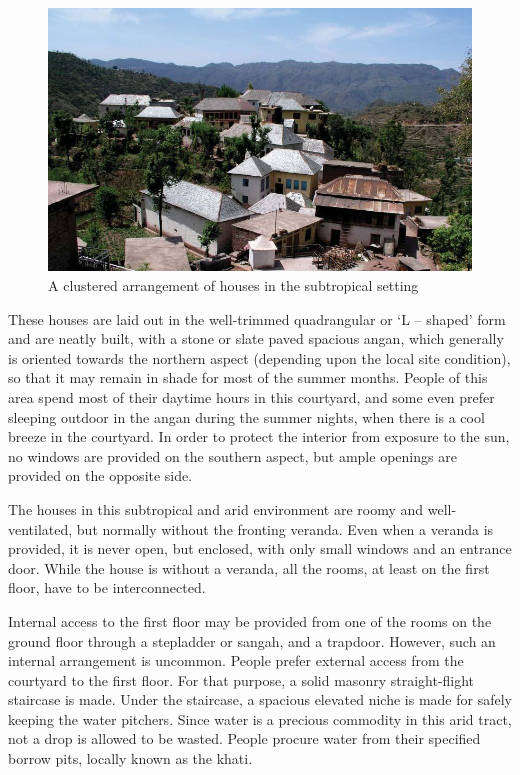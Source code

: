 \begin{figure}[!htbp]
\includegraphics[scale=.35]{images/chap02-10.jpg}
\caption{A clustered arrangement of houses in the subtropical setting}\label{chap02-fig10}
\end{figure}

These houses are laid out in the well-trimmed quadrangular or ‘L – shaped’ form and are neatly built, with a stone or slate paved spacious angan, which generally is oriented towards the northern aspect (depending upon the local site condition), so that it may remain in shade for most of the summer months. People of this area spend most of their daytime hours in this courtyard, and some even prefer sleeping outdoor in the angan during the summer nights, when there is a cool breeze in the courtyard. In order to protect the interior from exposure to the sun, no windows are provided on the southern aspect, but ample openings are provided on the opposite side.

The houses in this subtropical and arid environment are roomy and well-ventilated, but normally without the fronting veranda. Even when a veranda is provided, it is never open, but enclosed, with only small windows and an entrance door. While the house is without a veranda, all the rooms, at least on the first floor, have to be interconnected.

Internal access to the first floor may be provided from one of the rooms on the ground floor through a stepladder or sangah, and a trapdoor. However, such an internal arrangement is uncommon. People prefer external access from the courtyard to the first floor. For that purpose, a solid masonry straight-flight staircase is made. Under the staircase, a spacious elevated niche is made for safely keeping the water pitchers. Since water is a precious commodity in this arid tract, not a drop is allowed to be wasted. People procure water from their specified borrow pits, locally known as the khati.


